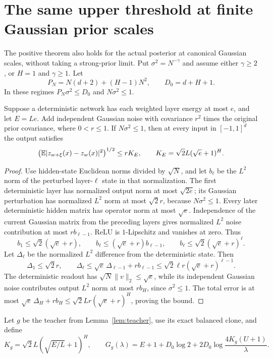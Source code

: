 \section{The same upper threshold at finite Gaussian prior scales}
\label{sec:finite-positive}

The positive theorem also holds for the actual posterior at canonical Gaussian scales, without taking a strong-prior limit. Put $\sigma^2=N^{-\gamma}$ and assume either $\gamma\geq2$, or $H=1$ and $\gamma\geq1$. Let
\[
 P_N=N(d+2)+(H-1)N^2,\qquad D_0=d+H+1.
\]
In these regimes $P_N\sigma^2\leq D_0$ and $N\sigma^2\leq1$.

\begin{lemma}
\label{lem:finite-perturbation}
Suppose a deterministic network has each weighted layer energy at most $e$, and let $E=Le$. Add independent Gaussian noise with covariance $r^2$ times the original prior covariance, where $0<r\leq1$. If $N\sigma^2\leq1$, then at every input in $[-1,1]^d$ the output satisfies
\[
 \left(\mathbb E|z_{w+\xi}(x)-z_w(x)|^2\right)^{1/2}
 \leq rK_E,\qquad K_E=\sqrt2 L(\sqrt e+1)^H.
\]
\end{lemma}
\begin{proof}
Use hidden-state Euclidean norms divided by $\sqrt N$, and let $b_\ell$ be the $L^2$ norm of the perturbed layer-$\ell$ state in that normalization. The first deterministic layer has normalized output norm at most $\sqrt{2e}$; its Gaussian perturbation has normalized $L^2$ norm at most $\sqrt2r$, because $N\sigma^2\leq1$. Every later deterministic hidden matrix has operator norm at most $\sqrt e$. Independence of the current Gaussian matrix from the preceding layers gives normalized $L^2$ noise contribution at most $r b_{\ell-1}$. ReLU is $1$-Lipschitz and vanishes at zero. Thus
\[
 b_1\leq\sqrt2(\sqrt e+r),\qquad
 b_\ell\leq(\sqrt e+r)b_{\ell-1},\qquad
 b_\ell\leq\sqrt2(\sqrt e+r)^\ell.
\]
Let $\Delta_\ell$ be the normalized $L^2$ difference from the deterministic state. Then
\[
 \Delta_1\leq\sqrt2r,\qquad
 \Delta_\ell\leq\sqrt e\,\Delta_{\ell-1}+r b_{\ell-1}
 \leq\sqrt2\ell r(\sqrt e+r)^{\ell-1}.
\]
The deterministic readout has $\sqrt N\|v\|_2\leq\sqrt e$, while its independent Gaussian noise contributes output $L^2$ norm at most $r b_H$, since $\sigma^2\leq1$. The total error is at most
$\sqrt e\,\Delta_H+r b_H\leq\sqrt2 Lr(\sqrt e+r)^H$, proving the bound.
\end{proof}

Let $g$ be the teacher from Lemma~\ref{lem:teacher}, use its exact balanced clone, and define
\begin{equation}
 K_g=\sqrt2 L(\sqrt{E/L}+1)^H,\qquad
 G_g(\lambda)=E+1+D_0\log2+
       2D_0\log\frac{4K_g(U+1)}\lambda.
 \label{eq:finite-G}
\end{equation}

